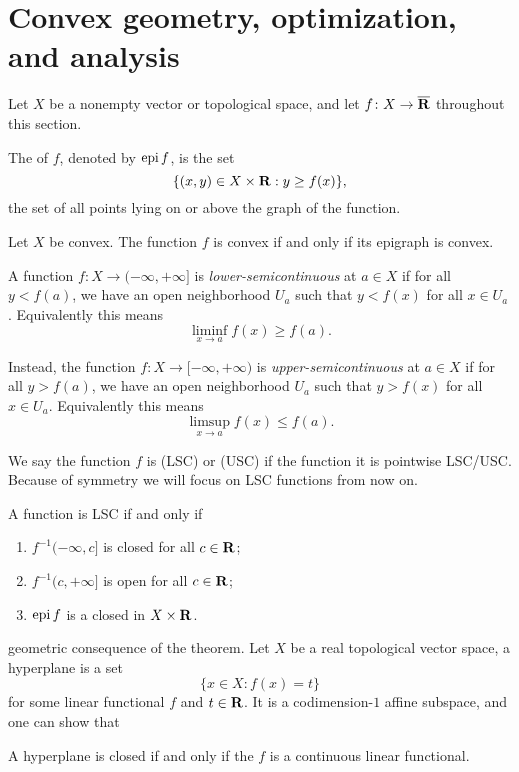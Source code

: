 \section{Convex geometry, optimization, and analysis}
    Let $X$ be a nonempty vector or topological space, and let $f\colon X \to \overline{\mathbf{R}}$ throughout this section.

    The  of $f$, denoted by $\operatorname{epi} f$, is the set \[\{(x,y) \in X \times \mathbf{R}: y \geq f(x)\},\] the set of all points lying on or above the graph of the function.

    \begin{fact}
        Let $X$ be convex. The function $f$ is convex if and only if its epigraph is convex.
    \end{fact}
    
    A function $f\colon X \to (-\infty,+\infty]$ is \emph{lower-semicontinuous} at $a\in X$ if for all $y < f(a)$, we have an open neighborhood $U_a$ such that $y < f(x)$ for all $x \in U_a$. Equivalently this means \[ \liminf_{x \to a} f(x) \geq f(a).\]
    
    Instead, the function $f\colon X \to [-\infty,+\infty)$ is \emph{upper-semicontinuous} at $a\in X$ if for all $y > f(a)$, we have an open neighborhood $U_a$ such that $y > f(x)$ for all $x \in U_a$. Equivalently this means \[ \limsup_{x \to a} f(x) \leq f(a).\]

    We say the function $f$ is  (LSC) or  (USC) if the function it is pointwise LSC/USC. Because of symmetry we will focus on LSC functions from now on. 
    
    A function is LSC if and only if \begin{enumerate}
        \item $f^{-1}(-\infty,c]$ is closed for all $c \in \mathbf{R}$;
        \item $f^{-1}(c,+\infty]$ is open for all $c \in \mathbf{R}$;
        \item $\operatorname{epi} f$ is a closed in $X \times \mathbf{R}$.
    \end{enumerate}

    geometric consequence of the  theorem. Let $X$ be a real topological vector space, a hyperplane is a set \[
        \{x \in X: f(x) = t\}
    \] for some linear functional $f$ and $t \in \mathbf{R}$. It is a codimension-$1$ affine subspace, and one can show that \begin{fact}
        A hyperplane is closed if and only if the $f$ is a continuous linear functional.
    \end{fact}

